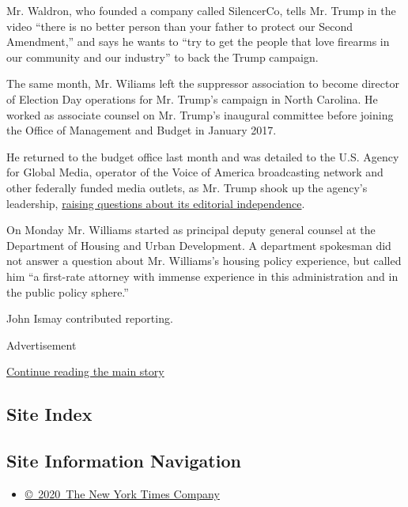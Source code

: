 Mr. Waldron, who founded a company called SilencerCo, tells Mr. Trump in
the video ``there is no better person than your father to protect our
Second Amendment,'' and says he wants to ``try to get the people that
love firearms in our community and our industry'' to back the Trump
campaign.

The same month, Mr. Wiliams left the suppressor association to become
director of Election Day operations for Mr. Trump's campaign in North
Carolina. He worked as associate counsel on Mr. Trump's inaugural
committee before joining the Office of Management and Budget in January
2017.

He returned to the budget office last month and was detailed to the U.S.
Agency for Global Media, operator of the Voice of America broadcasting
network and other federally funded media outlets, as Mr. Trump shook up
the agency's leadership,
\href{https://www.nytimes.com/2020/06/17/us/politics/michael-pack-media-agency.html}{raising
questions about its editorial independence}.

On Monday Mr. Williams started as principal deputy general counsel at
the Department of Housing and Urban Development. A department spokesman
did not answer a question about Mr. Williams's housing policy
experience, but called him ``a first-rate attorney with immense
experience in this administration and in the public policy sphere.''

John Ismay contributed reporting.

Advertisement

\protect\hyperlink{after-bottom}{Continue reading the main story}

\hypertarget{site-index}{%
\subsection{Site Index}\label{site-index}}

\hypertarget{site-information-navigation}{%
\subsection{Site Information
Navigation}\label{site-information-navigation}}

\begin{itemize}
\tightlist
\item
  \href{https://help.nytimes.com/hc/en-us/articles/115014792127-Copyright-notice}{©~2020~The
  New York Times Company}
\end{itemize}

